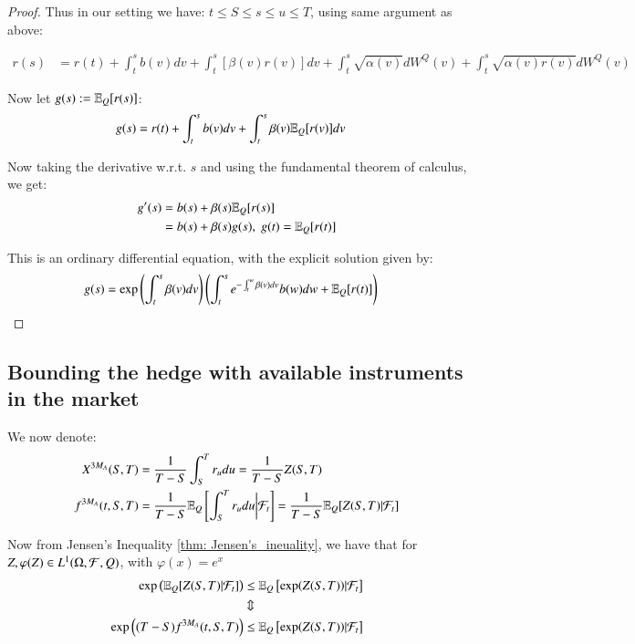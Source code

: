 \begin{proof}
Thus in our setting we have: $t\leq S \leq s \leq u \leq T$, using same argument as above: 

\begin{align*}
r(s) &= r(t) + \int_{t}^{s}b(v)dv + \int_{t}^{s}[\beta(v)r(v)]dv
+ \int_{t}^{s}\sqrt{\alpha(v)}dW^{Q}(v)
+ \int_{t}^{s}\sqrt{\alpha(v)r(v)}dW^{Q}(v)    
\end{align*}

Now let $g(s) := \mathbb{E}_{Q}[r(s)]$: 
\begin{align*}
g(s) &= r(t) + \int_{t}^{s}b(v)dv + \int_{t}^{s}\beta(v)\mathbb{E}_{Q}[r(v)]dv
\end{align*}

Now taking the derivative w.r.t. $s$ and using the fundamental theorem of calculus, we get: 
\begin{align*}
g'(s) &= b(s) + \beta(s)\mathbb{E}_{Q}[r(s)] \\ 
&= b(s) + \beta(s)g(s), \; g(t) = \mathbb{E}_{Q}[r(t)]
\end{align*}

This is an ordinary differential equation, with the explicit solution given by:
\begin{align*}
 g(s) &= \exp\left(
 \int_{t}^{s}\beta(v)dv
 \right)
 \left(
 \int_{t}^{s}e^{-\int_{t}^{w}\beta(v)dv}b(w)dw + \mathbb{E}_{Q}[r(t)]
 \right)
\end{align*}
\end{proof}


\subsection{Bounding the hedge with available instruments in the market}

We now denote: 
\begin{align*}
X^{3M_{A}}(S,T) &= \frac{1}{T-S}\int_{S}^{T}r_{u}du = \frac{1}{T-S}Z(S,T) \\ 
f^{3M_{A}}(t,S,T) &= \frac{1}{T-S}\mathbb{E}_{Q}\left[
\int_{S}^{T}r_{u}du\bigg{|}\mathcal{F}_{t}
\right] = \frac{1}{T-S}\mathbb{E}_{Q}[Z(S,T)|\mathcal{F}_{t}]
\end{align*}

Now from Jensen's Inequality \ref{thm: Jensen's_ineuality}, we have that for $Z, \varphi(Z) \in L^{1}(\Omega, \mathcal{F}, Q)$, with $\varphi(x) = e^{x}$
\begin{align}
\label{eq: hedging_availible_inst_market_1}
\exp\left(
\mathbb{E}_{Q}[Z(S,T)|\mathcal{F}_{t}]
\right)
&\leq 
\mathbb{E}_{Q}\left[
\exp(Z(S,T))|\mathcal{F}_{t}
\right] \nonumber \\ 
&\Updownarrow \nonumber \\ 
\exp\left(
(T-S)f^{3M_{A}}(t,S,T)
\right) 
&\leq 
\mathbb{E}_{Q}\left[\exp(Z(S,T))|\mathcal{F}_{t}\right]
\end{align} 

